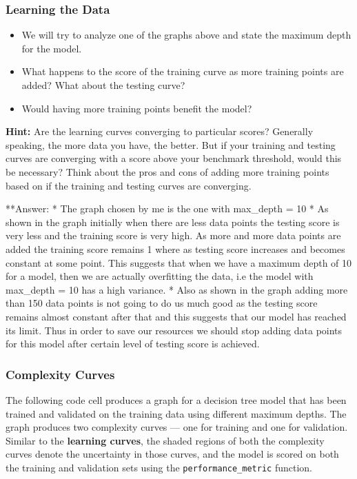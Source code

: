 \documentclass[11pt]{article}
\providecommand{\tightlist}{%
      \setlength{\itemsep}{0pt}\setlength{\parskip}{0pt}}
\begin{document}
    \subsubsection{Learning the Data}\label{learning-the-data}

\begin{itemize}
\tightlist
\item
  We will try to analyze one of the graphs above and state the maximum
  depth for the model.
\item
  What happens to the score of the training curve as more training
  points are added? What about the testing curve?
\item
  Would having more training points benefit the model?
\end{itemize}

\textbf{Hint:} Are the learning curves converging to particular scores?
Generally speaking, the more data you have, the better. But if your
training and testing curves are converging with a score above your
benchmark threshold, would this be necessary? Think about the pros and
cons of adding more training points based on if the training and testing
curves are converging.

    **Answer: * The graph chosen by me is the one with max\_depth = 10 * As
shown in the graph initially when there are less data points the testing
score is very less and the training score is very high. As more and more
data points are added the training score remains 1 where as testing
score increases and becomes constant at some point. This suggests that
when we have a maximum depth of 10 for a model, then we are actually
overfitting the data, i.e the model with max\_depth = 10 has a high
variance. * Also as shown in the graph adding more than 150 data points
is not going to do us much good as the testing score remains almost
constant after that and this suggests that our model has reached its
limit. Thus in order to save our resources we should stop adding data
points for this model after certain level of testing score is achieved.

    \subsubsection{Complexity Curves}\label{complexity-curves}

The following code cell produces a graph for a decision tree model that
has been trained and validated on the training data using different
maximum depths. The graph produces two complexity curves --- one for
training and one for validation. Similar to the \textbf{learning
curves}, the shaded regions of both the complexity curves denote the
uncertainty in those curves, and the model is scored on both the
training and validation sets using the \texttt{performance\_metric}
function.
\end{document}
